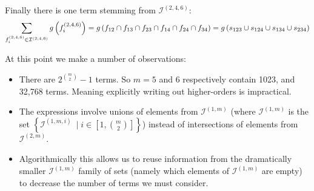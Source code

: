 \documentclass[11pt]{article}
\newcommand{\gxn}[1]{g\left(#1\right)}
\newcommand{\fn}[1]{f^{(#1)}}
\newcommand{\ints}[1]{\mathcal{I}^{(#1)}}
\begin{document}
Finally there is one term stemming from $\ints{2,4,6}$:	  
\begin{align}
    \sum_{\fn{2,4,6}_i\in\ints{2,4,6}}\gxn{\fn{2,4,6}_i} =
      \gxn{\IDiDjDkDlDmDn} = \gxn{\Iii\cup\Ijj\cup\Ikk\cup\Ill}         
\end{align}


At this point we make a number of observations:
\begin{itemize}
	\item There are $2^{m \choose 2} - 1$ terms. So $m=5$ and $6$ 
	      respectively contain 1023, and 32,768 terms. Meaning explicitly
	      writing out higher-orders is impractical.
	\item The expressions involve unions of elements from $\ints{1,m}$ (where 
	      $\ints{1,m}$ is the set 
	      $\left\lbrace\ints{1,m,i}\ \mid i\in[1,{m \choose 2}]\right\rbrace$) 
	      instead of intersections of elements from $\ints{2,m}$.
	\item Algorithmically this allows us to reuse information from the 
	      dramatically smaller $\ints{1,m}$ family of sets (namely which 
	      elements of $\ints{1,m}$ are empty) to decrease the number of terms 
	      we must consider.
\end{itemize}
\end{document}
